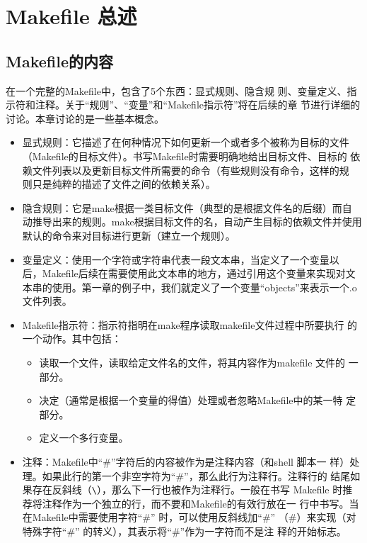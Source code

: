 ﻿\chapter{Makefile 总述}

\section{Makefile的内容}
在一个完整的Makefile中，包含了5个东西：显式规则、隐含规
则、变量定义、指示符和注释。关于“规则”、“变量”和“Makefile指示符”将在后续的章
节进行详细的讨论。本章讨论的是一些基本概念。

\begin{itemize}\itemsep=0pt \parskip=0pt
  \item 显式规则：它描述了在何种情况下如何更新一个或者多个被称为目标的文件
      （Makefile的目标文件）。书写Makefile时需要明确地给出目标文件、目标的
      依赖文件列表以及更新目标文件所需要的命令（有些规则没有命令，这样的规
      则只是纯粹的描述了文件之间的依赖关系）。
  \item 隐含规则：它是make根据一类目标文件（典型的是根据文件名的后缀）而自
      动推导出来的规则。make根据目标文件的名，自动产生目标的依赖文件并使用
      默认的命令来对目标进行更新（建立一个规则）。
  \item 变量定义：使用一个字符或字符串代表一段文本串，当定义了一个变量以
      后，Makefile后续在需要使用此文本串的地方，通过引用这个变量来实现对文
      本串的使用。第一章的例子中，我们就定义了一个变量“objects”来表示一个.o
      文件列表。
  \item Makefile指示符：指示符指明在make程序读取makefile文件过程中所要执行
      的一个动作。其中包括：
  \begin{itemize}
    \item 读取一个文件，读取给定文件名的文件，将其内容作为makefile 文件的
        一部分。
    \item 决定（通常是根据一个变量的得值）处理或者忽略Makefile中的某一特
        定部分。
    \item 定义一个多行变量。
  \end{itemize}
  \item 注释：Makefile中“\#”字符后的内容被作为是注释内容（和shell 脚本一
      样）处理。如果此行的第一个非空字符为“\#”，那么此行为注释行。注释行的
      结尾如果存在反斜线（\verb"\"），那么下一行也被作为注释行。一般在书写
      Makefile 时推荐将注释作为一个独立的行，而不要和Makefile的有效行放在一
      行中书写。当在Makefile中需要使用字符“\#” 时，可以使用反斜线加“\#”
      （\#）来实现（对特殊字符“\#” 的转义），其表示将“\#”作为一字符而不是注
      释的开始标志。
\end{itemize}


